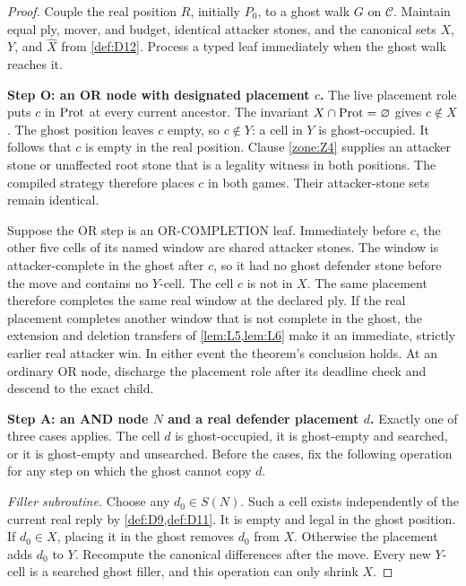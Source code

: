 \begin{proof}
Couple the real position $R$, initially $P_0$, to a ghost walk $G$ on
$\mathcal C$.  Maintain equal ply, mover, and budget, identical attacker
stones, and the canonical sets $X$, $Y$, and $\widehat X$ from
\cref{def:D12}.  Process a typed leaf immediately when the ghost walk reaches
it.

\medskip\noindent
\textbf{Step O: an OR node with designated placement $c$.}
The live placement role puts $c$ in $\operatorname{Prot}$ at every current ancestor.  The
invariant $X\cap\operatorname{Prot}=\varnothing$ gives $c\notin X$.  The ghost position
leaves $c$ empty, so $c\notin Y$: a cell in $Y$ is ghost-occupied.  It follows
that $c$ is empty in the real position.  Clause \cref{zone:Z4} supplies an
attacker stone or unaffected root stone that is a legality witness in both
positions.  The compiled strategy therefore places $c$ in both games.  Their
attacker-stone sets remain identical.

Suppose the OR step is an OR-COMPLETION leaf.  Immediately before $c$, the
other five cells of its named window are shared attacker stones.  The window
is attacker-complete in the ghost after $c$, so it had no ghost defender
stone before the move and contains no $Y$-cell.  The cell $c$ is not in $X$.
The same placement therefore completes the same real window at the declared
ply.  If the real placement completes another window that is not complete in
the ghost, the extension and deletion transfers of
\cref{lem:L5,lem:L6} make it an immediate, strictly earlier real attacker win.
In either event the theorem's conclusion holds.  At an ordinary OR node,
discharge the placement role after its deadline check and descend to the
exact child.

\medskip\noindent
\textbf{Step A: an AND node $N$ and a real defender placement $d$.}
Exactly one of three cases applies.  The cell $d$ is ghost-occupied, it is
ghost-empty and searched, or it is ghost-empty and unsearched.  Before the
cases, fix the following operation for any step on which the ghost cannot
copy $d$.

\smallskip\noindent
\emph{Filler subroutine.}
Choose any $d_0\in S(N)$.  Such a cell exists independently of the current
real reply by \cref{def:D9,def:D11}.  It is empty and legal in the ghost
position.  If $d_0\in X$, placing it in the ghost removes $d_0$ from $X$.
Otherwise the placement adds $d_0$ to $Y$.  Recompute the canonical
differences after the move.  Every new $Y$-cell is a searched ghost filler,
and this operation can only shrink $X$.


\end{proof}
